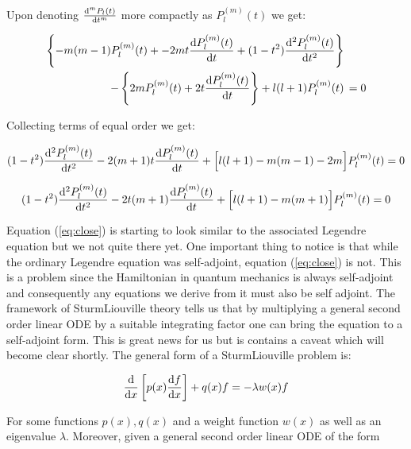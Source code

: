 \documentclass{article}
\begin{document}
    Upon denoting $\odv[order = m]{P_l(t)}{t}$ more compactly as $P^{(m)}_l(t)$ we get:

    \begin{equation}
        \begin{aligned}
            \left\{-m(m - 1)P^{(m)}_l(t) + -2mt\odv{P^{(m)}_l(t)}{t} + (1 - t^2)\odv[order = 2]{P^{(m)}_l(t)}{t}\right\}& \\
            - \left\{2mP^{(m)}_l(t) + 2t\odv{P^{(m)}_l(t)}{t}\right\} + l(l+1)P^{(m)}_l(t) &\, = 0
        \end{aligned}
    \end{equation}

    Collecting terms of equal order we get:

    \begin{equation}
        (1 - t^2)\odv[order = 2]{P^{(m)}_l(t)}{t} - 2(m + 1)t\odv{P^{(m)}_l(t)}{t} + \Big[ l(l + 1) - m(m - 1) - 2m \Big]P^{(m)}_l(t) = 0
    \end{equation}

    \begin{equation}
        \label{eq:close}
        (1 - t^2)\odv[order = 2]{P^{(m)}_l(t)}{t} - 2t(m + 1)\odv{P^{(m)}_l(t)}{t} + \Big[ l(l + 1) - m(m + 1)\Big]P^{(m)}_l(t) = 0
    \end{equation}

    Equation (\ref{eq:close}) is starting to look similar to the associated Legendre equation but we not quite there yet. One important thing to notice is that
    while the ordinary Legendre equation was self-adjoint, equation (\ref{eq:close}) is not. This is a problem since the Hamiltonian in quantum mechanics is always
    self-adjoint and consequently any equations we derive from it must also be self adjoint. The framework of Sturm\textendash Liouville theory tells us that by multiplying
    a general second order linear ODE by a suitable integrating factor one can bring the equation to a self-adjoint form. This is great news for us but is contains a caveat
    which will become clear shortly. The general form of a Sturm\textendash Liouville problem is:

    \begin{equation}
        \label{eq:sturm-liouville}
        \odv{}{x}\left[ p(x)\odv{f}{x} \right] + q(x)f = -\lambda w(x)f
    \end{equation}

    For some functions $p(x), q(x)$ and a weight function $w(x)$ as well as an eigenvalue $\lambda$. Moreover, given a general second order linear ODE of the form
\end{document}
